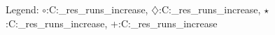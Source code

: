 Legend: {\color{CornflowerBlue}$\circ$}:C:\Users\tristan\Documents\ppsn\BBOB\raw\_res\remaining\_runs\sigmalb\_increase\exdata{}, {\color{Orange}$\diamondsuit$}:C:\Users\tristan\Documents\ppsn\BBOB\raw\_res\remaining\_runs\sigmalb\_increase\exdata{}, {\color{Green}$\star$}:C:\Users\tristan\Documents\ppsn\BBOB\raw\_res\remaining\_runs\sigmalb\_increase\exdata{}, {\color{red}+}:C:\Users\tristan\Documents\ppsn\BBOB\raw\_res\remaining\_runs\sigmalb\_increase\exdata{}